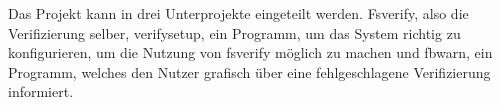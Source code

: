 Das Projekt kann in drei Unterprojekte eingeteilt werden. Fsverify, also die Verifizierung selber, verifysetup, ein Programm, um das System richtig zu konfigurieren, um die Nutzung von fsverify möglich zu machen und fbwarn, ein Programm, welches den Nutzer grafisch über eine fehlgeschlagene Verifizierung informiert.




